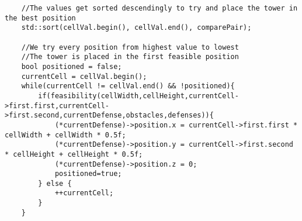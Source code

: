 \begin{lstlisting}
	//The values get sorted descendingly to try and place the tower in the best position
	std::sort(cellVal.begin(), cellVal.end(), comparePair);
	
	//We try every position from highest value to lowest
	//The tower is placed in the first feasible position
	bool positioned = false;
	currentCell = cellVal.begin();
	while(currentCell != cellVal.end() && !positioned){
		if(feasibility(cellWidth,cellHeight,currentCell->first.first,currentCell->first.second,currentDefense,obstacles,defenses)){
			(*currentDefense)->position.x = currentCell->first.first * cellWidth + cellWidth * 0.5f;
        	(*currentDefense)->position.y = currentCell->first.second * cellHeight + cellHeight * 0.5f;
        	(*currentDefense)->position.z = 0; 
        	positioned=true;
		} else {
			++currentCell;
		}
	}
\end{lstlisting}
